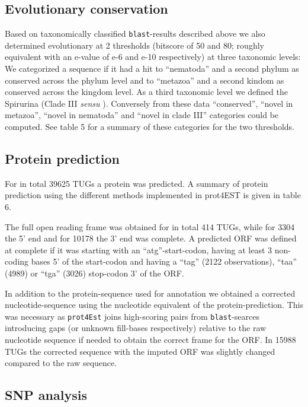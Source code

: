\documentclass[10pt]{bmc_article}
\newenvironment{bmcformat}{\begin{raggedright}\baselineskip20pt\sloppy\setboolean{publ}{false}}{\end{raggedright}\baselineskip20pt\sloppy}
\begin{document}
\begin{bmcformat}
\subsection*{Evolutionary conservation}


Based on taxonomically classified \texttt{blast}-results described
above we also determined evolutionary at 2 thresholds (bitscore of 50
and 80; roughly equivalent with an e-value of e-6 and e-10
respectively) at three taxonomic levels: We categorized a sequence if
it had a hit to ``nematoda'' and a second phylum as conserved across
the phylum level and to ``metazoa'' and a second kindom as conserved
across the kingdom level. As a third taxonomic level we defined the
Spirurina (Clade III \textit{sensu}
\cite{blaxter_molecular_1998}). Conversely from these data
``conserved'', ``novel in metazoa'', ``novel in nematoda'' and ``novel
in clade III'' categories could be computed. See table 5 for a summary
of these categories for the two thresholds.


\subsection*{Protein prediction}



For in total
39625 TUGs
a protein was predicted. A summary of protein prediction using the
different methods implemented in prot4EST is given in table 6.
 
The full open reading frame was obtained for in total
414 TUGs, while for
3304 the 5' end and for
10178 the 3’ end was complete.  A
predicted ORF was defined at complete if it was starting with an
``atg''-start-codon, having at least 3 non-coding bases 5' of the
start-codon and having a ``tag'' (2122
observations), ``taa'' (4989) or ``tga''
(3026) stop-codon 3' of the ORF.

In addition to the protein-sequence used for annotation we obtained a
corrected nucleotide-sequence using the nucleotide equivalent of the
protein-prediction. This was necessary as \texttt{prot4Est} joins
high-scoring pairs from \texttt{blast}-searces introducing gaps (or
unknown fill-bases respectively) relative to the raw nucleotide
sequence if needed to obtain the correct frame for the ORF. In
15988 TUGs the corrected sequence with the
imputed ORF was slightly changed compared to the raw sequence.
 
\subsection*{SNP analysis}
\label{sec:snp-analysis}


\end{bmcformat}
\end{document}
